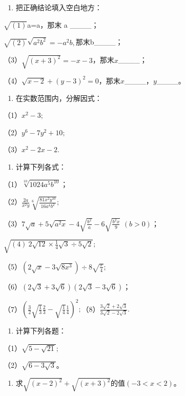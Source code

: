 \begin{enumerate}
\item
  把正确结论填入空白地方：
\end{enumerate}

\(\sqrt{(1)}\)\textbar a\textbar=a，那末 a \_\_\_\_；

\(\sqrt{(2)}\sqrt{a^{2}b^{2}}=-a^{2}b,\)那末b\_\_\_\_；

（3）\(\sqrt{(x + 3)^2} = -x - 3\)，那末\(x\)\_\_\_\_；

（4）\(\sqrt{x - 2} + (y - 3)^2 = 0\)，那末\(x\)\_\_\_\_，\(y\)\_\_\_\_。

\begin{enumerate}[start=2]
\item
  在实数范围内，分解因式：
\end{enumerate}

（1）\(x^{2} - 3;\)

（2）\(y^{6}-7y^{2}+10;\)

（3）\(x^{2} - 2x - 2.\)

\begin{enumerate}[start=3]
\item
  计算下列各式：
\end{enumerate}

（1）\(\sqrt[10]{1024a^{5}b^{10}}\)；

（2）\(\frac{2a}{x^2y}\sqrt[6]{\frac{81x^2y^{10}}{16a^4b^2}};\)

（3）\(7\sqrt{a} + 5\sqrt{a^2x} - 4\sqrt{\frac{b^2}{a}} - 6\sqrt{\frac{b^2x}{9}}\) \((b > 0)\)；

\(\sqrt{(4)\ 2\sqrt{12}\times\frac{1}{4}\sqrt{3}\div5\sqrt{2}};\)

（5）\((2\sqrt{x} - 3\sqrt{8x^3}) \div 8\sqrt{\frac{x}{4}};\)

（6）\((2\sqrt{3} + 3\sqrt{6})(2\sqrt{3} - 3\sqrt{6})\)；

（7）\(\left(\frac{3}{2}\sqrt{\frac{1}{3}}\frac{2}{3} -\sqrt{\frac{1}{4}}\frac{1}{4}\right)^2;\)（8）\(\frac{3\sqrt{2} + 2\sqrt{3}}{3\sqrt{2} - 2\sqrt{3}}.\)

\begin{enumerate}[start=4]
\item
  计算下列各题：
\end{enumerate}

（1）\(\sqrt{5 - \sqrt{21}};\)

（2）\(\sqrt{6 - 3\sqrt{3}}\)。

\begin{enumerate}[start=5]
\item
  求\(\sqrt{(x-2)^{2}}+\sqrt{(x+3)^{2}}\)的值\((-3<x<2)\)。
\end{enumerate}

